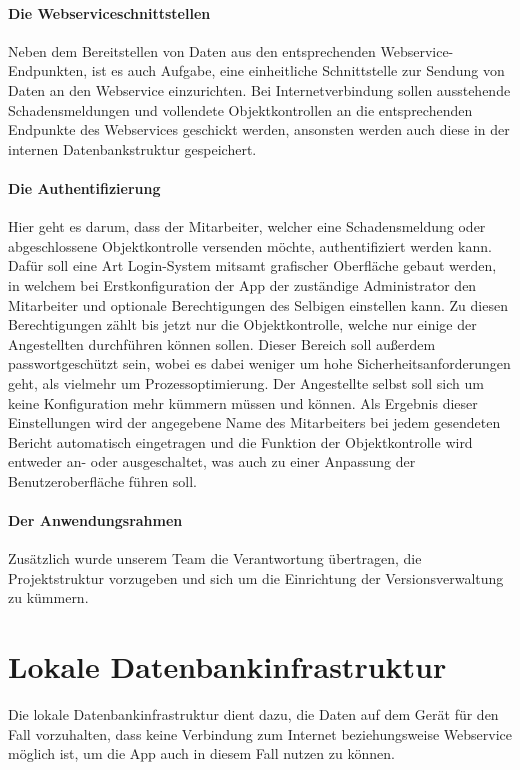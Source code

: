 \documentclass[12pt]{article}
\begin{document}
\paragraph{Die Webserviceschnittstellen} Neben dem Bereitstellen von Daten aus den entsprechenden Webservice-Endpunkten, ist es auch Aufgabe, eine einheitliche Schnittstelle zur Sendung von Daten an den Webservice einzurichten. Bei Internetverbindung sollen ausstehende Schadensmeldungen und vollendete Objektkontrollen an die entsprechenden Endpunkte des Webservices geschickt werden, ansonsten werden auch diese in der internen Datenbankstruktur gespeichert.
\paragraph{Die Authentifizierung} Hier geht es darum, dass der Mitarbeiter, welcher eine Schadensmeldung oder abgeschlossene Objektkontrolle versenden möchte, authentifiziert werden kann. Dafür soll eine Art Login-System mitsamt grafischer Oberfläche gebaut werden, in welchem bei Erstkonfiguration der App der zuständige Administrator den Mitarbeiter und optionale Berechtigungen des Selbigen einstellen kann. Zu diesen Berechtigungen zählt bis jetzt nur die Objektkontrolle, welche nur einige der Angestellten durchführen können sollen. Dieser Bereich soll außerdem passwortgeschützt sein, wobei es dabei weniger um hohe Sicherheitsanforderungen geht, als vielmehr um Prozessoptimierung. Der Angestellte selbst soll sich um keine Konfiguration mehr kümmern müssen und können. Als Ergebnis dieser Einstellungen wird der angegebene Name des Mitarbeiters bei jedem gesendeten Bericht automatisch eingetragen und die Funktion der Objektkontrolle wird entweder an- oder ausgeschaltet, was auch zu einer Anpassung der Benutzeroberfläche führen soll.
\paragraph{Der Anwendungsrahmen} Zusätzlich wurde unserem Team die Verantwortung übertragen, die Projektstruktur vorzugeben und sich um die Einrichtung der Versionsverwaltung zu kümmern.

\newpage
\section{Lokale Datenbankinfrastruktur}
Die lokale Datenbankinfrastruktur dient dazu, die Daten auf dem Gerät für den Fall vorzuhalten, dass keine Verbindung zum Internet beziehungsweise Webservice möglich ist, um die App auch in diesem Fall nutzen zu können.
\end{document}
